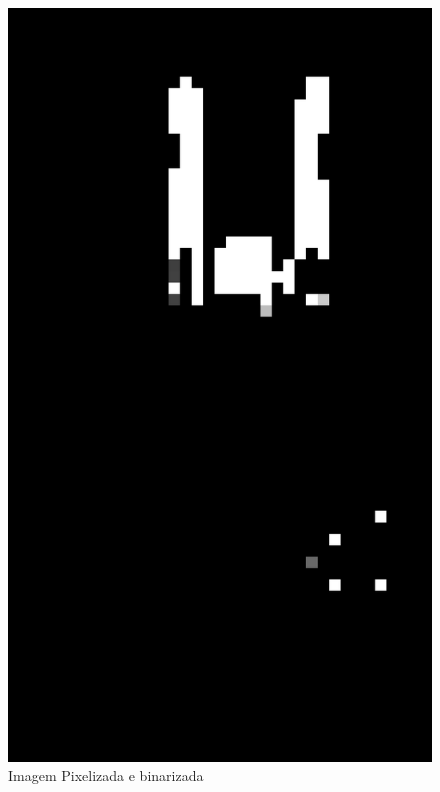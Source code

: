 \begin{figure}[H]
    \centering
    \caption{Imagem Pixelizada e binarizada}
        \begin{minipage}{\sizeImg\textwidth}
            \includegraphics[width=\textwidth]{figuras/mao_barra/pixel.png}
        \end{minipage}
        \begin{minipage}{\sizeImg\textwidth}

\end{minipage}
\end{figure}
